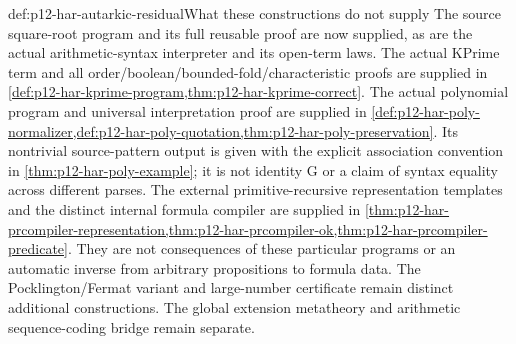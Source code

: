 \begin{proofboundary}{def:p12-har-autarkic-residual}{What these constructions do not supply}
The source square-root program and its full reusable proof are now supplied,
as are the actual arithmetic-syntax interpreter and its open-term laws.
The actual KPrime term and all order/boolean/bounded-fold/characteristic
proofs are supplied in \cref{def:p12-har-kprime-program,thm:p12-har-kprime-correct}.
The actual polynomial program and universal interpretation proof are
supplied in \cref{def:p12-har-poly-normalizer,def:p12-har-poly-quotation,thm:p12-har-poly-preservation}.
Its nontrivial source-pattern output is given with the explicit
association convention in \cref{thm:p12-har-poly-example}; it is not
identity G or a claim of syntax equality across different parses.
The external primitive-recursive representation templates and the distinct
internal formula compiler are supplied in
\cref{thm:p12-har-prcompiler-representation,thm:p12-har-prcompiler-ok,thm:p12-har-prcompiler-predicate}.
They are not consequences of these particular programs or an automatic
inverse from arbitrary propositions to formula data. The Pocklington/Fermat
variant and large-number certificate remain distinct additional constructions.
The global
extension metatheory and arithmetic sequence-coding bridge remain separate.
\end{proofboundary}
